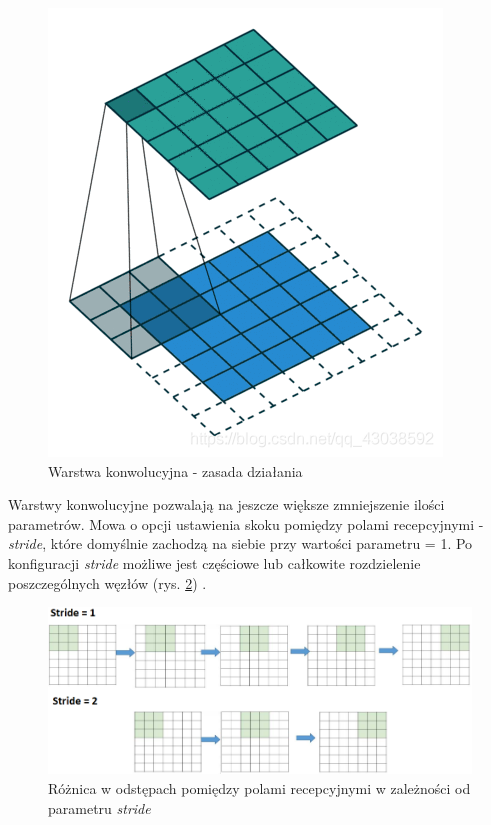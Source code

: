 \documentclass[a4paper,12pt,oneside]{book} %
\begin{document}
\begin{figure}[h]
	\centering
	\includegraphics[scale=0.4]{conv.png}
	\caption{Warstwa konwolucyjna - zasada działania \cite{developpapercom_2021}}
	\label{conv_img}
\end{figure}

Warstwy konwolucyjne pozwalają na jeszcze większe zmniejszenie ilości parametrów. Mowa o opcji ustawienia skoku pomiędzy polami recepcyjnymi - \emph{stride}, które domyślnie zachodzą na siebie przy wartości parametru = 1. Po konfiguracji \emph{stride} możliwe jest częściowe lub całkowite rozdzielenie poszczególnych węzłów (rys. \ref{stride_img}) \cite{8308186}.

\begin{figure}[h]
	\centering
	\includegraphics[scale=0.6]{stride.png}
	\caption{Różnica w odstępach pomiędzy polami recepcyjnymi w zależności od parametru \emph{stride} \cite{8308186}}
	\label{stride_img}
\end{figure}
\end{document}
